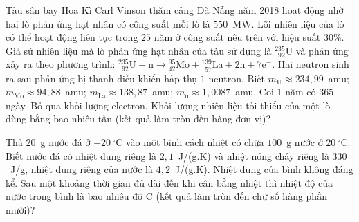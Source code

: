 	\begin{ex}%
		Tàu sân bay Hoa Kì Carl Vinson thăm cảng Đà Nẵng năm 2018 hoạt động nhờ hai lò phản ứng hạt nhân có công suất mỗi lò là $550$~MW. Lõi nhiên liệu của lò có thể hoạt động liên tục trong $25$ năm ở công suất nêu trên với hiệu suất $30\%$. Giả sử nhiên liệu mà lò phản ứng hạt nhân của tàu sử dụng là $^{235}_{\phantom{2}92}\text{U}$ và phản ứng xảy ra theo phương trình: $^{235}_{\phantom{2}92}\text{U}+\text{n}\to{}^{95}_{42}\text{Mo}+{}^{139}_{\phantom{1}57}\text{La}+2\text{n}+7\text{e}^-$. Hai neutron sinh ra sau phản ứng bị thanh điều khiển hấp thụ $1$ neutron. Biết $m_\text{U}\approx 234{,}99$~amu; $m_\text{Mo}\approx 94{,}88$~amu; $m_\text{La}\approx 138{,}87$~amu; $m_\text{n}\approx 1{,}0087$~amu. Coi $1$ năm có $365$ ngày. Bỏ qua khối lượng electron. Khối lượng nhiên liệu tối thiểu của một lò dùng bằng bao nhiêu tấn (kết quả làm tròn đến hàng đơn vị)?
		\par
	\end{ex}

	\begin{ex}%
		Thả $20$~g nước đá ở $-20\,^\circ\text{C}$ vào một bình cách nhiệt có chứa $100$~g nước ở $20\,^\circ\text{C}$. Biết nước đá có nhiệt dung riêng là $2{,}1$~J/(g.K) và nhiệt nóng chảy riêng là $330$~J/g, nhiệt dung riêng của nước là $4{,}2$~J/(g.K). Nhiệt dung của bình không đáng kể. Sau một khoảng thời gian đủ dài đến khi cân bằng nhiệt thì nhiệt độ của nước trong bình là bao nhiêu độ C (kết quả làm tròn đến chữ số hàng phần mười)?
		\par
	\end{ex}

